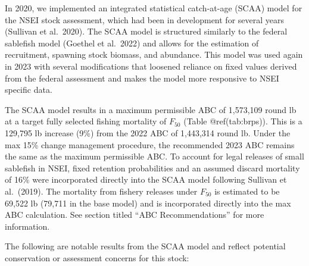 \documentclass[
]{article}
\begin{document}
In 2020, we implemented an integrated statistical catch-at-age (SCAA)
model for the NSEI stock assessment, which had been in development for
several years (Sullivan et al.~2020). The SCAA model is structured
similarly to the federal sablefish model (Goethel et al.~2022) and
allows for the estimation of recruitment, spawning stock biomass, and
abundance. This model was used again in 2023 with several modifications
that loosened reliance on fixed values derived from the federal
assessment and makes the model more responsive to NSEI specific data.

The SCAA model results in a maximum permissible ABC of 1,573,109 round
lb at a target fully selected fishing mortality of \(F_{50}\) (Table
@ref(tab:brps)). This is a 129,795 lb increase (9\%) from the 2022 ABC
of 1,443,314 round lb. Under the max 15\% change management procedure,
the recommended 2023 ABC remains the same as the maximum permissible
ABC. To account for legal releases of small sablefish in NSEI, fixed
retention probabilities and an assumed discard mortality of 16\% were
incorporated directly into the SCAA model following Sullivan et
al.~(2019). The mortality from fishery releases under \(F_{50}\) is
estimated to be 69,522 lb (79,711 in the base model) and is incorporated
directly into the max ABC calculation. See section titled ``ABC
Recommendations'' for more information.

The following are notable results from the SCAA model and reflect
potential conservation or assessment concerns for this stock:
\end{document}
